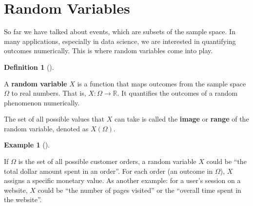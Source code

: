 \documentclass[
  letterpaper,
  DIV=11,
  numbers=noendperiod]{scrreport}
\theoremstyle{definition}
\newtheorem{example}{Example}[chapter]
\theoremstyle{plain}
\theoremstyle{definition}
\newtheorem{definition}{Definition}[chapter]
\theoremstyle{plain}
\theoremstyle{remark}
\begin{document}
\section{Random Variables}\label{random-variables}

So far we have talked about events, which are subsets of the sample
space. In many applications, especially in data science, we are
interested in quantifying outcomes numerically. This is where random
variables come into play.

\begin{tcolorbox}[enhanced jigsaw, breakable, opacityback=0, leftrule=.75mm, colback=white, bottomtitle=1mm, coltitle=black, toptitle=1mm, titlerule=0mm, bottomrule=.15mm, colframe=quarto-callout-note-color-frame, title={Random Variable}, opacitybacktitle=0.6, colbacktitle=quarto-callout-note-color!10!white, rightrule=.15mm, arc=.35mm, toprule=.15mm, left=2mm]

\begin{definition}[]\protect\hypertarget{def-random-variable}{}\label{def-random-variable}

A \textbf{random variable} \(X\) is a function that maps outcomes from
the sample space \(\Omega\) to real numbers. That is,
\(X: \Omega \to \mathbb{R}\). It quantifies the outcomes of a random
phenomenon numerically.

The set of all possible values that \(X\) can take is called the
\textbf{image} or \textbf{range} of the random variable, denoted as
\(X(\Omega)\).

\end{definition}

\end{tcolorbox}

\begin{tcolorbox}[enhanced jigsaw, breakable, opacityback=0, leftrule=.75mm, colback=white, bottomtitle=1mm, coltitle=black, toptitle=1mm, titlerule=0mm, bottomrule=.15mm, colframe=quarto-callout-note-color-frame, title={Random variable examples}, opacitybacktitle=0.6, colbacktitle=quarto-callout-note-color!10!white, rightrule=.15mm, arc=.35mm, toprule=.15mm, left=2mm]

\begin{example}[]\protect\hypertarget{exm-random-variable}{}\label{exm-random-variable}

If \(\Omega\) is the set of all possible customer orders, a random
variable \(X\) could be ``the total dollar amount spent in an order''.
For each order (an outcome in \(\Omega\)), \(X\) assigns a specific
monetary value. As another example: for a user's session on a website,
\(X\) could be ``the number of pages visited'' or the ``overall time
spent in the website''.

\end{example}

\end{tcolorbox}
\end{document}
